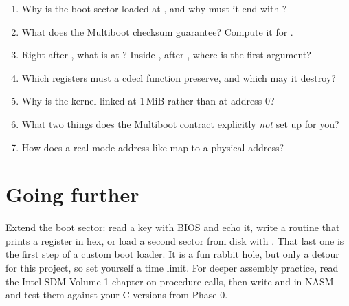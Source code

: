 \documentclass[11pt,a4paper]{article}
\begin{document}
\begin{questionbox}
\begin{enumerate}
  \item Why is the boot sector loaded at , and why must it end with ?
  \item What does the Multiboot checksum guarantee? Compute it for .
  \item Right after , what is at \code{[esp]}? Inside , after , where is the first argument?
  \item Which registers must a cdecl function preserve, and which may it destroy?
  \item Why is the kernel linked at 1\,MiB rather than at address 0?
  \item What two things does the Multiboot contract explicitly \emph{not} set up for you?
  \item How does a real-mode address like  map to a physical address?
\end{enumerate}
\end{questionbox}

\section{Going further}

Extend the boot sector: read a key with BIOS  and echo it, write a routine that prints a register in
hex, or load a second sector from disk with . That last one is the first step of a custom boot loader.
It is a fun rabbit hole, but only a detour for this project, so set yourself a time limit. For deeper assembly
practice, read the Intel SDM Volume 1 chapter on procedure calls, then write  and  in NASM
and test them against your C versions from Phase 0.

\booklegend
\end{document}
